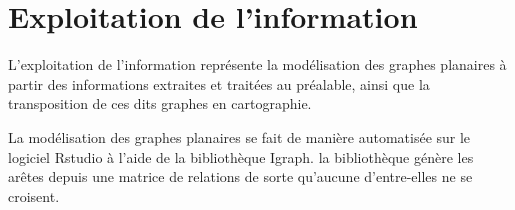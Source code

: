 \section{Exploitation de l'information}
L'exploitation de l'information représente la modélisation des graphes planaires à partir des informations extraites et traitées au préalable, ainsi que la transposition de ces  dits graphes en cartographie.

La modélisation des graphes planaires se fait de manière automatisée sur le logiciel Rstudio à l'aide de la bibliothèque Igraph. la bibliothèque génère les arêtes depuis une matrice de relations de sorte qu'aucune d'entre-elles ne se croisent. 
